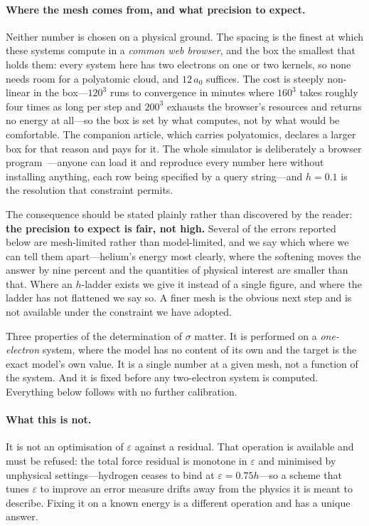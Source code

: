 \documentclass[11pt,a4paper]{article}
\begin{document}
\paragraph{Where the mesh comes from, and what precision to expect.} Neither number is chosen on a
physical ground. The spacing is the finest at which these systems compute in a \emph{common web
browser}, and the box the smallest that holds them: every system here has two electrons on one or
two kernels, so none needs room for a polyatomic cloud, and $12\,a_0$ suffices. The cost is steeply
non-linear in the box---$120^3$ runs to convergence in minutes where $160^3$ takes roughly four
times as long per step and $200^3$ exhausts the browser's resources and returns no energy at all---so
the box is set by what computes, not by what would be comfortable. The companion article, which
carries polyatomics, declares a larger box for that reason and pays for it. The whole simulator is deliberately a browser program~\cite{code}---anyone can
load it and reproduce every number here without installing anything, each row being specified by a
query string---and $h = 0.1$ is the resolution that constraint permits.

The consequence should be stated plainly rather than discovered by the reader: \textbf{the precision
to expect is fair, not high.} Several of the errors reported below are mesh-limited rather than
model-limited, and we say which where we can tell them apart---helium's energy most clearly, where
the softening moves the answer by nine percent and the quantities of physical interest are smaller
than that. Where an $h$-ladder exists we give it instead of a single figure, and where the ladder
has not flattened we say so. A finer mesh is the obvious next step and is not available under the
constraint we have adopted.

Three properties of the determination of $\sigma$ matter. It is performed on a \emph{one-electron}
system, where the model has no content of its own and the target is the exact model's own value. It
is a single number at a given mesh, not a function of the system. And it is fixed before any
two-electron system is computed. Everything below follows with no further calibration.

\paragraph{What this is not.} It is not an optimisation of $\varepsilon$ against a residual. That
operation is available and must be refused: the total force residual is monotone in $\varepsilon$
and minimised by unphysical settings---hydrogen ceases to bind at $\varepsilon = 0.75h$---so a
scheme that tunes $\varepsilon$ to improve an error measure drifts away from the physics it is
meant to describe. Fixing it on a known energy is a different operation and has a unique answer.
\end{document}
